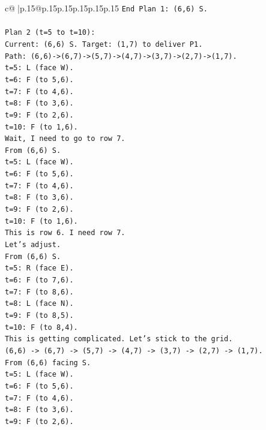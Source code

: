\documentclass{article}
\begin{document}
{\begin{supertabular}{c@{$\;$}|p{.15\linewidth}@{}p{.15\linewidth}p{.15\linewidth}p{.15\linewidth}p{.15\linewidth}p{.15\linewidth}}
{{{\texttt{End Plan 1: (6,6) S.} \\
\\ 
\texttt{Plan 2 (t=5 to t=10):} \\
\texttt{Current: (6,6) S. Target: (1,7) to deliver P1.} \\
\texttt{Path: (6,6){-}>(6,7){-}>(5,7){-}>(4,7){-}>(3,7){-}>(2,7){-}>(1,7).} \\
\texttt{t=5: L (face W).} \\
\texttt{t=6: F (to 5,6).} \\
\texttt{t=7: F (to 4,6).} \\
\texttt{t=8: F (to 3,6).} \\
\texttt{t=9: F (to 2,6).} \\
\texttt{t=10: F (to 1,6).} \\
\texttt{Wait, I need to go to row 7.} \\
\texttt{From (6,6) S.} \\
\texttt{t=5: L (face W).} \\
\texttt{t=6: F (to 5,6).} \\
\texttt{t=7: F (to 4,6).} \\
\texttt{t=8: F (to 3,6).} \\
\texttt{t=9: F (to 2,6).} \\
\texttt{t=10: F (to 1,6).} \\
\texttt{This is row 6. I need row 7.} \\
\texttt{Let's adjust.} \\
\texttt{From (6,6) S.} \\
\texttt{t=5: R (face E).} \\
\texttt{t=6: F (to 7,6).} \\
\texttt{t=7: F (to 8,6).} \\
\texttt{t=8: L (face N).} \\
\texttt{t=9: F (to 8,5).} \\
\texttt{t=10: F (to 8,4).} \\
\texttt{This is getting complicated. Let's stick to the grid.} \\
\texttt{(6,6) {-}> (6,7) {-}> (5,7) {-}> (4,7) {-}> (3,7) {-}> (2,7) {-}> (1,7).} \\
\texttt{From (6,6) facing S.} \\
\texttt{t=5: L (face W).} \\
\texttt{t=6: F (to 5,6).} \\
\texttt{t=7: F (to 4,6).} \\
\texttt{t=8: F (to 3,6).} \\
\texttt{t=9: F (to 2,6).} \\
}}}
\end{supertabular}}
\end{document}
